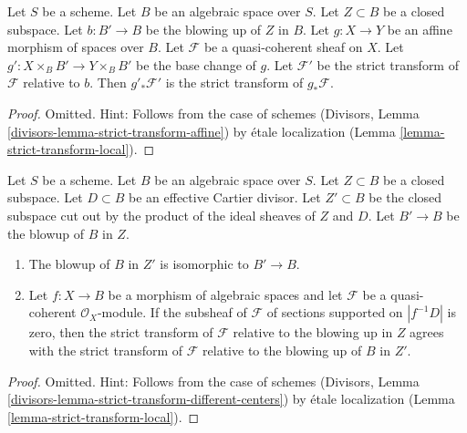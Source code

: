 \begin{lemma}
\label{lemma-strict-transform-affine}
Let $S$ be a scheme. Let $B$ be an algebraic space over $S$.
Let $Z \subset B$ be a closed subspace.
Let $b : B' \to B$ be the blowing up of $Z$ in $B$. Let
$g : X \to Y$ be an affine morphism of spaces over $B$.
Let $\mathcal{F}$ be a quasi-coherent sheaf on $X$.
Let $g' : X \times_B B' \to Y \times_B B'$ be the base change
of $g$. Let $\mathcal{F}'$ be the strict transform of $\mathcal{F}$
relative to $b$. Then $g'_*\mathcal{F}'$ is the strict transform
of $g_*\mathcal{F}$.
\end{lemma}

\begin{proof}
Omitted. Hint: Follows from the case of schemes
(Divisors, Lemma \ref{divisors-lemma-strict-transform-affine})
by \'etale localization (Lemma \ref{lemma-strict-transform-local}).
\end{proof}

\begin{lemma}
\label{lemma-strict-transform-different-centers}
Let $S$ be a scheme. Let $B$ be an algebraic space over $S$.
Let $Z \subset B$ be a closed subspace.
Let $D \subset B$ be an effective Cartier divisor.
Let $Z' \subset B$ be the closed subspace cut out by the product
of the ideal sheaves of $Z$ and $D$.
Let $B' \to B$ be the blowup of $B$ in $Z$.
\begin{enumerate}
\item The blowup of $B$ in $Z'$ is isomorphic to $B' \to B$.
\item Let $f : X \to B$ be a morphism of algebraic spaces and let $\mathcal{F}$
be a quasi-coherent $\mathcal{O}_X$-module. If the subsheaf of $\mathcal{F}$ of
sections supported on $|f^{-1}D|$ is zero, then the
strict transform of $\mathcal{F}$ relative to the blowing up
in $Z$ agrees with the strict transform of $\mathcal{F}$ relative
to the blowing up of $B$ in $Z'$.
\end{enumerate}
\end{lemma}

\begin{proof}
Omitted. Hint: Follows from the case of schemes
(Divisors, Lemma \ref{divisors-lemma-strict-transform-different-centers})
by \'etale localization (Lemma \ref{lemma-strict-transform-local}).
\end{proof}

